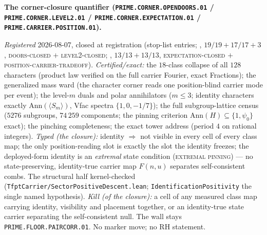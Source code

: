 \par\smallskip\noindent\textbf{The corner-closure quantifier
(\texttt{PRIME.CORNER.OPENDOORS.01} /
\texttt{PRIME.CORNER.LEVEL2.01} /
\texttt{PRIME.CORNER.EXPECTATION.01} /
\texttt{PRIME.CARRIER.POSITION.01}).}
{\sloppy
\emph{Registered} 2026-08-07, closed at registration (stop-list
entries; ,
$19/19 + 17/17 + 3$, \textsc{doors-closed} $+$
\textsc{level2-closed};
, $13/13 + 13/13$,
\textsc{expectation-closed} $+$
\textsc{position-carrier-tradeoff}).  \emph{Certified/exact:} the
$18$-class collapse of all $128$ characters (product law verified
on the full carrier Fourier, exact Fractions); the generalized
mass ward (the character corner reads one position-blind carrier
mode per event); the level-$m$ duals and polar annihilators
($m \le 3$; identity characters exactly
$\mathrm{Ann}(\langle S_m\rangle)$, Vfac spectra
$\{1, 0, -1/7\}$); the full subgroup-lattice census ($5276$
subgroups, $74\,259$ components; the pinning criterion
$\mathrm{Ann}(H) \subseteq \{1, \psi_0\}$ exact); the pinching
completeness; the exact tower address (period $4$ on rational
integers).  \emph{Typed (the closure):} identity $\Rightarrow$
not visible in every cell of every class map; the only
position-reading slot is exactly the slot the identity freezes;
the deployed-form identity is an \emph{extremal} state condition
(\textsc{extremal pinning}) --- no state-preserving, identity-true
carrier map $F(n, u)$ separates self-consistent combs.  The
structural half kernel-checked
(\texttt{TfptCarrier/SectorPositiveDescent.lean};
\texttt{IdentificationPositivity} the single named hypothesis).
\emph{Kill (of the closure):} a cell of any measured class map
carrying identity, visibility and placement together, or an
identity-true state carrier separating the self-consistent null.
The wall stays \texttt{PRIME.FLOOR.PAIRCORR.01}.  No marker move;
no RH statement.\par}


